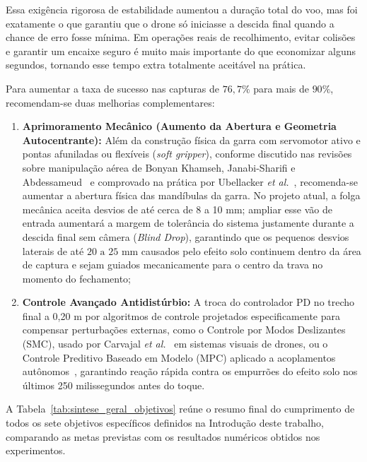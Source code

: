 Essa exigência rigorosa de estabilidade aumentou a duração total do voo, mas foi exatamente o que garantiu que o drone só iniciasse a descida final quando a chance de erro fosse mínima. Em operações reais de recolhimento, evitar colisões e garantir um encaixe seguro é muito mais importante do que economizar alguns segundos, tornando esse tempo extra totalmente aceitável na prática.


Para aumentar a taxa de sucesso nas capturas de $76,7\%$ para mais de $90\%$, recomendam-se duas melhorias complementares:
\begin{enumerate}
	\item \textbf{Aprimoramento Mecânico (Aumento da Abertura e Geometria Autocentrante):} Além da construção física da garra com servomotor ativo e pontas afuniladas ou flexíveis (\textit{soft gripper}), conforme discutido nas revisões sobre manipulação aérea de Bonyan Khamseh, Janabi-Sharifi e Abdessameud~\cite{bonyan2018} e comprovado na prática por Ubellacker \textit{et al.}~\cite{ubellacker2024}, recomenda-se aumentar a abertura física das mandíbulas da garra. No projeto atual, a folga mecânica aceita desvios de até cerca de 8 a 10 mm; ampliar esse vão de entrada aumentará a margem de tolerância do sistema justamente durante a descida final sem câmera (\textit{Blind Drop}), garantindo que os pequenos desvios laterais de até $20\text{ a } 25\text{ mm}$ causados pelo efeito solo continuem dentro da área de captura e sejam guiados mecanicamente para o centro da trava no momento do fechamento;
	
	\item \textbf{Controle Avançado Antidistúrbio:} A troca do controlador PD no trecho final a 0,20 m por algoritmos de controle projetados especificamente para compensar perturbações externas, como o Controle por Modos Deslizantes (SMC), usado por Carvajal \textit{et al.}~\cite{carvajal2024} em sistemas visuais de drones, ou o Controle Preditivo Baseado em Modelo (MPC) aplicado a acoplamentos autônomos~\cite{pramono2025}, garantindo reação rápida contra os empurrões do efeito solo nos últimos 250 milissegundos antes do toque.
\end{enumerate}


A Tabela~\ref{tab:sintese_geral_objetivos} reúne o resumo final do cumprimento de todos os sete objetivos específicos definidos na Introdução deste trabalho, comparando as metas previstas com os resultados numéricos obtidos nos experimentos.


